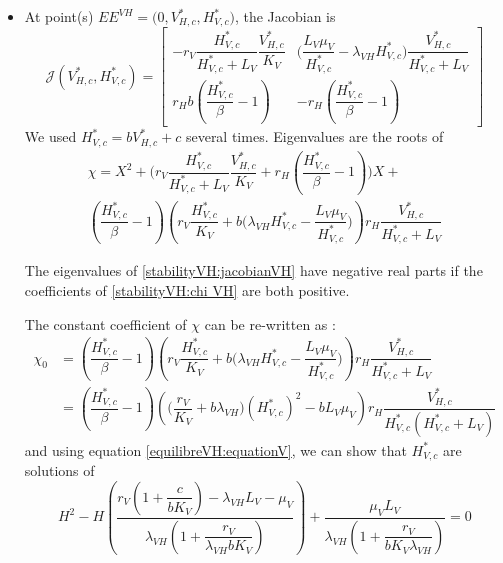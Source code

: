 \documentclass{article}
\newcommand{\lv}{\lambda_{VH}}
\begin{document}
\begin{itemize}
\item At point(s) $EE^{VH} = \Big(0, V^*_{H, c}, H^*_{V, c})$, the Jacobian is
\begin{equation}
\mathcal{J}(V^*_{H, c}, H^*_{V, c}) = \begin{bmatrix}
-r_V\dfrac{H^*_{V, c}}{H^*_{V, c} + L_V} \dfrac{V^*_{H, c}}{K_V} & \Big(\dfrac{L_V\mu_V}{H^*_{V, c}} - \lv H^*_{V, c}) \dfrac{V^*_{H, c}}{H^*_{V, c} + L_V} \\
r_H b (\dfrac{H^*_{V, c}}{\beta} - 1) & -r_H(\dfrac{H^*_{V, c}}{\beta} - 1)
\end{bmatrix}
\label{stabilityVH:jacobianVH}
\end{equation}
We used $H^*_{V, c} = b V^*_{H, c} + c$ several times. Eigenvalues are the roots of 
\begin{multline}
\chi = X^2 + \Big(r_V  \dfrac{H^*_{V, c}}{H^*_{V, c}+L_V}\dfrac{V^*_{H, c}}{K_V} + r_H(\dfrac{H^*_{V, c}}{\beta} - 1)\Big)X + \\
 (\dfrac{H^*_{V, c}}{\beta} - 1) \left(r_V  \dfrac{H^*_{V, c}}{K_V}  + b \Big(\lv H^*_{V, c} - \dfrac{L_V \mu_V}{H^*_{V, c}} \Big) \right) r_H\dfrac{V^*_{H, c}}{H^*_{V, c} + L_V}
 \label{stabilityVH:chi VH}
\end{multline}

The eigenvalues of \eqref{stabilityVH:jacobianVH} have negative real parts if the coefficients of \eqref{stabilityVH:chi VH} are both positive.

The constant coefficient of $\chi$ can be re-written as :
\begin{subequations}
\begin{align}
\chi_0 &= (\dfrac{H^*_{V, c}}{\beta} - 1) \left(r_V  \dfrac{H^*_{V, c}}{K_V}  + b \Big(\lv H^*_{V, c} - \dfrac{L_V \mu_V}{H^*_{V, c}} \Big) \right) r_H\dfrac{V^*_{H, c}}{H^*_{V, c} + L_V} \\
&= (\dfrac{H^*_{V, c}}{\beta} - 1) \left( \Big(\dfrac{r_V}{K_V} + b\lv\Big) (H^*_{V, c})^2 - b L_V \mu_V \right) r_H\dfrac{V^*_{H, c}}{H^*_{V, c}(H^*_{V, c} + L_V)}
\end{align}
\end{subequations}
and using equation \eqref{equilibreVH:equationV}, we can show that $H^*_{V, c}$ are solutions of
\begin{equation}
H^2 - H \left( \dfrac{r_V(1 + \dfrac{c}{bK_V}) - \lv L_V - \mu_V}{\lv(1 + \dfrac{r_V}{\lv bK_V})} \right) + \dfrac{\mu_V L_V}{\lv(1 + \dfrac{r_V}{bK_V\lv})} = 0
\label{equilibreVH:equation H}
\end{equation}


\end{itemize}
\end{document}
